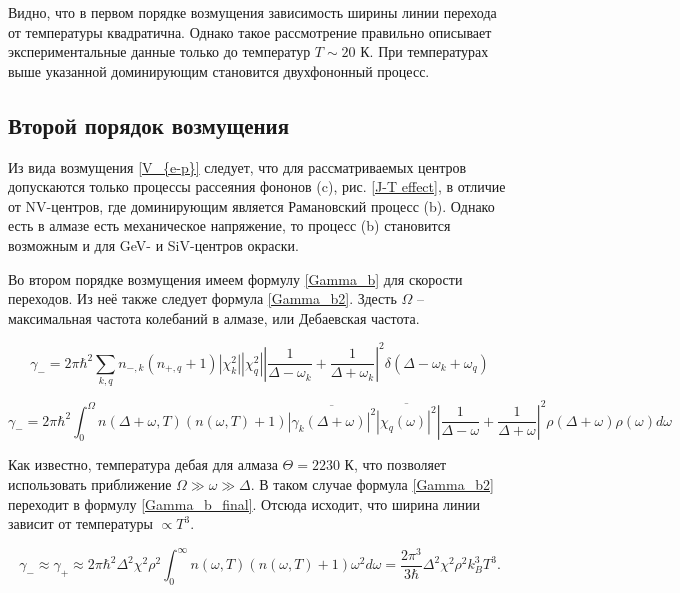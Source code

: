 Видно, что в первом порядке возмущения зависимость ширины линии перехода от температуры
квадратична. Однако такое рассмотрение правильно описывает экспериментальные данные
только до температур $T \sim 20 \text{ К}$. При температурах выше указанной доминирующим
становится двухфононный процесс.

\subsection{Второй порядок возмущения}
Из вида возмущения \ref{V_{e-p}} следует, что для рассматриваемых центров допускаются только
процессы рассеяния фононов (c), рис. \ref{J-T effect}, в отличие от NV-центров, где
доминирующим является Рамановский процесс (b). Однако есть в алмазе есть механическое
напряжение, то процесс (b) становится возможным и для GeV- и SiV-центров окраски. 

Во втором порядке возмущения имеем формулу \ref{Gamma_b} для скорости переходов.
Из неё также следует формула \ref{Gamma_b2}. Здесть $\Omega$ -- максимальная
частота колебаний в алмазе, или Дебаевская частота.

\begin{equation}
    \label{Gamma_b}
    \gamma_{-} = 2\pi \hbar^2 \sum_{k, q}n_{-, k}\left(n_{+, q} + 1 \right) 
    |\chi_k^2||\chi_q^2|\left|\frac{1}{\Delta - \omega_k} + \frac{1}{\Delta + \omega_k
    } \right|^2 \delta\left(\Delta - \omega_k + \omega_q \right)
\end{equation}

\begin{equation}
    \label{Gamma_b2}
    \gamma_{-} = 2 \pi \hbar^2 \int_{0}^{\Omega} n\left(\Delta + \omega, T\right)
    \left(n\left(\omega, T \right) + 1\right) \overline{\left|\gamma_k \left(
        \Delta + \omega
    \right)\right|^2}\overline{\left|\chi_q\left(\omega\right)\right|^2}\left|
    \frac{1}{\Delta - \omega} + \frac{1}{\Delta + \omega}\right|^2\rho\left(\Delta + \omega
    \right)\rho\left(\omega\right)d\omega
\end{equation}


Как известно, температура дебая для алмаза $\Theta = 2230 \text{ К}$, что позволяет
использовать приближение $\Omega \gg \omega \gg \Delta$. В таком случае формула
\ref{Gamma_b2} переходит в формулу \ref{Gamma_b_final}. Отсюда исходит, что ширина
линии зависит от температуры $\propto T^3$. 

\begin{equation}
    \label{Gamma_b_final}
    \gamma_{-} \approx \gamma_{+} \approx 2 \pi \hbar^2 \Delta^2 \chi^2 \rho^2
    \int_{0}^{\infty} n\left(\omega, T\right)\left(n\left(\omega, T\right)+1\right)
    \omega^2 d\omega = \frac{2 \pi^3}{3\hbar}\Delta^2 \chi^2 \rho^2 k_{B}^3 T^3.
\end{equation}


